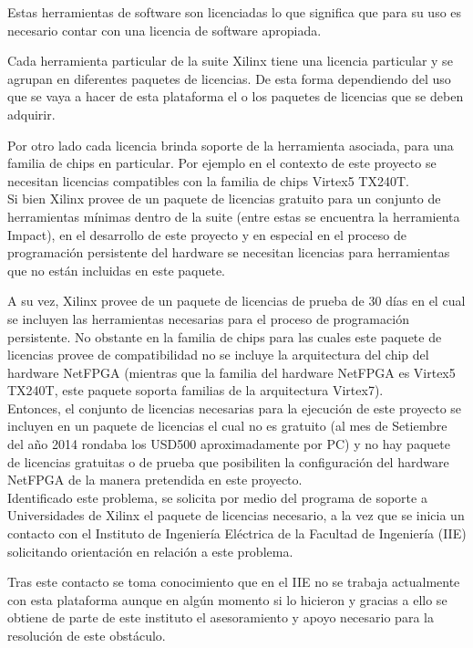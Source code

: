 Estas herramientas de software son licenciadas lo que significa que para su uso es necesario contar con una licencia de software apropiada.

Cada herramienta particular de la suite Xilinx tiene una licencia particular y se agrupan en diferentes paquetes de licencias. De esta forma dependiendo del uso que se vaya a hacer de esta plataforma el o los paquetes de licencias que se deben adquirir.

Por otro lado cada licencia brinda soporte de la herramienta asociada, para una familia de chips en particular. Por ejemplo en el contexto de este proyecto se necesitan licencias compatibles con la familia de chips Virtex5 TX240T.\\

Si bien Xilinx provee de un paquete de licencias gratuito para un conjunto de herramientas mínimas dentro de la suite (entre estas se encuentra la herramienta Impact), en el desarrollo de este proyecto y en especial en el proceso de programaci\'on persistente del hardware se necesitan licencias para herramientas que no están incluidas en este paquete.

A su vez, Xilinx provee de un paquete de licencias de prueba de 30 días en el cual se incluyen las herramientas necesarias para el proceso de programaci\'on persistente. No obstante en la familia de chips para las cuales este paquete de licencias provee de compatibilidad no se incluye la arquitectura del chip del hardware NetFPGA (mientras que la familia del hardware NetFPGA es Virtex5 TX240T, este paquete soporta familias de la arquitectura Virtex7).\\

Entonces, el conjunto de licencias necesarias para la ejecuci\'on de este proyecto se incluyen en un paquete de licencias el cual no es gratuito (al mes de Setiembre del año 2014 rondaba los USD500 aproximadamente por PC) y no hay paquete de licencias gratuitas o de prueba que posibiliten la configuraci\'on del hardware NetFPGA de la manera pretendida en este proyecto.\\

Identificado este problema, se solicita por medio del programa de soporte a Universidades de Xilinx el paquete de licencias necesario, a la vez que se inicia un contacto con el Instituto de Ingeniería Eléctrica de la Facultad de Ingeniería (IIE) solicitando orientación en relación a este problema.

Tras este contacto se toma conocimiento que en el IIE no se trabaja actualmente con esta plataforma aunque en alg\'un momento si lo hicieron y gracias a ello se obtiene de parte de este instituto
el asesoramiento y apoyo necesario para la resolución de este obstáculo. 

